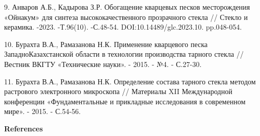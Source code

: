 \begin{refs}
9. Анваров А.Б., Кадырова З.Р. Обогащение кварцевых песков месторождения
«Ойнакум» для синтеза высококачественного прозрачного стекла // Стекло и
керамика. -2023. -Т.96(10). -С.48-54. DOI:10.14489/glc.2023.10.
pp.048-054.

10. Бурахта В.А., Рамазанова Н.К. Применение кварцевого песка
ЗападноКазахстанской области в технологии производства тарного стекла //
Вестник ВКГТУ «Технические науки». - 2015. - №4. - С.27-30.

11. Бурахта В.А., Рамазанова Н.К. Определение состава тарного стекла
методом растрового электронного микроскопа // Материалы XII
Международной конференции «Фундаментальные и прикладные исследования в
современном мире». - 2015. - С.54-56.
\end{refs}

\begin{center}
{\bfseries References}
\end{center}


